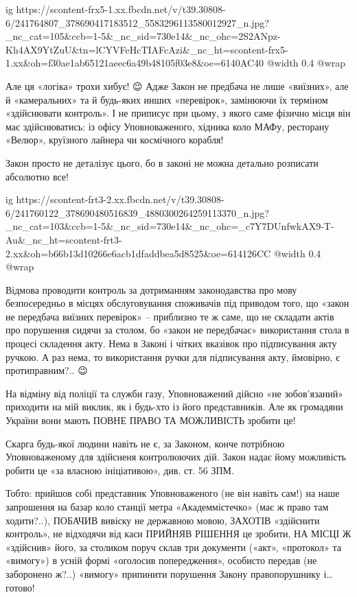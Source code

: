 \ifcmt
  ig https://scontent-frx5-1.xx.fbcdn.net/v/t39.30808-6/241764807_378690417183512_5583296113580012927_n.jpg?_nc_cat=105&ccb=1-5&_nc_sid=730e14&_nc_ohc=2S2ANpz-Kh4AX9YtZuU&tn=lCYVFeHcTIAFcAzi&_nc_ht=scontent-frx5-1.xx&oh=f30ae1ab65121aeec6a49b48105f03e8&oe=6140AC40
  @width 0.4
  @wrap 
\fi

Але ця «логіка» трохи хибує! 😉 Адже Закон не предбача не лише «виїзних», але й
«камеральних» та й будь-яких инших «перевірок», замінюючи їх терміном
«здійснювати контроль». І не приписує при цьому, з якого саме фізично місця він
має здійснюватись: із офісу Уповноваженого, хідника коло МАФу, ресторану
«Велюр», круїзного лайнера чи космічного корабля!

Закон просто не деталізує цього, бо в законі не можна детально розписати
абсолютно все!

\ifcmt
  ig https://scontent-frt3-2.xx.fbcdn.net/v/t39.30808-6/241760122_378690480516839_4880300264259113370_n.jpg?_nc_cat=103&ccb=1-5&_nc_sid=730e14&_nc_ohc=_c7Y7DUnfwkAX9-T-Au&_nc_ht=scontent-frt3-2.xx&oh=b66b13d10266e6acb1dfaddbea5d8525&oe=614126CC
  @width 0.4
  @wrap 
\fi

Відмова проводити контроль за дотриманням законодавства про мову безпосередньо
в місцях обслуговування споживачів під приводом того, що «закон не передбача
виїзних перевірок» – приблизно те ж саме, що не складати актів про порушення
сидячи за столом, бо «закон не передбачає» використання стола в процесі
складення акту. Нема в Законі і чітких вказівок про підписування акту ручкою. А
раз нема, то використання ручки для підписування акту, ймовірно, є
протиправним?.. 😉 

На відміну від поліції та служби газу, Уповноважений дійсно «не зобов’язаний»
приходити на мій виклик, як і будь-хто із його представників. Але як громадяни
України вони мають ПОВНЕ ПРАВО ТА МОЖЛИВІСТЬ зробити це!

Скарга будь-якої людини навіть не є, за Законом, конче потрібною Уповноваженому
для здійсненя контролюючих дій. Закон надає йому можливість робити це «за
власною ініціативою», див. ст. 56 ЗПМ.

Тобто: прийшов собі представник Уповноваженого (не він навіть сам!) на наше
запрошення на базар коло станції метра «Академмістечко» (має ж право там
ходити?..), ПОБАЧИВ вивіску не державною мовою, ЗАХОТІВ «здійснити контроль»,
не відходячи від каси ПРИЙНЯВ РІШЕННЯ це зробити, НА МІСЦІ Ж «здійснив» його,
за столиком поруч склав три документи («акт», «протокол» та «вимогу») в усній
формі «оголосив попередження», особисто передав (не заборонено ж?..) «вимогу»
припинити порушення Закону правопорушнику і… готово!


